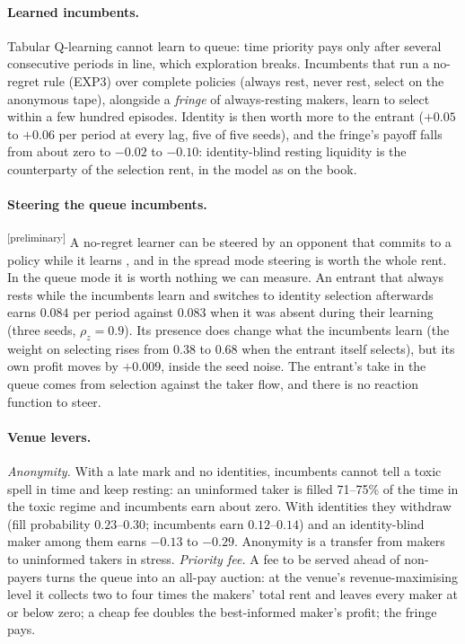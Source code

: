 \documentclass[11pt]{article}
\newcommand{\prelim}{\textsuperscript{[preliminary]}}
\begin{document}
\paragraph{Learned incumbents.} Tabular Q-learning cannot learn to queue: time priority pays only after several consecutive periods in line, which exploration breaks. Incumbents that run a no-regret rule (EXP3) over complete policies (always rest, never rest, select on the anonymous tape), alongside a \emph{fringe} of always-resting makers, learn to select within a few hundred episodes. Identity is then worth more to the entrant ($+0.05$ to $+0.06$ per period at every lag, five of five seeds), and the fringe's payoff falls from about zero to $-0.02$ to $-0.10$: identity-blind resting liquidity is the counterparty of the selection rent, in the model as on the book.

\paragraph{Steering the queue incumbents.}\prelim{} A no-regret learner can be steered by an opponent that commits to a policy while it learns \cite{dss}, and in the spread mode steering is worth the whole rent. In the queue mode it is worth nothing we can measure. An entrant that always rests while the incumbents learn and switches to identity selection afterwards earns $0.084$ per period against $0.083$ when it was absent during their learning (three seeds, $\rho_z=0.9$). Its presence does change what the incumbents learn (the weight on selecting rises from $0.38$ to $0.68$ when the entrant itself selects), but its own profit moves by $+0.009$, inside the seed noise. The entrant's take in the queue comes from selection against the taker flow, and there is no reaction function to steer.

\paragraph{Venue levers.} \emph{Anonymity.} With a late mark and no identities, incumbents cannot tell a toxic spell in time and keep resting: an uninformed taker is filled 71--75\% of the time in the toxic regime and incumbents earn about zero. With identities they withdraw (fill probability $0.23$--$0.30$; incumbents earn $0.12$--$0.14$) and an identity-blind maker among them earns $-0.13$ to $-0.29$. Anonymity is a transfer from makers to uninformed takers in stress. \emph{Priority fee.} A fee to be served ahead of non-payers turns the queue into an all-pay auction: at the venue's revenue-maximising level it collects two to four times the makers' total rent and leaves every maker at or below zero; a cheap fee doubles the best-informed maker's profit; the fringe pays.
\end{document}
